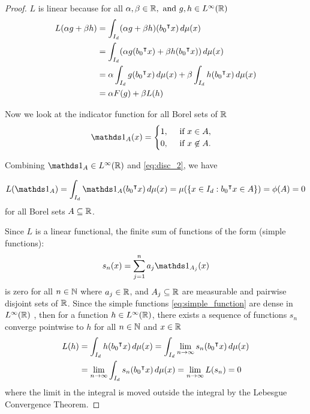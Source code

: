 \begin{proof}
    $L$ is linear because for all $\alpha, \beta \in \mathbb{R}, \text{ and } g, h \in
    L^{\infty}(\mathbb{R})$
    \begin{align*}
        L(\alpha g + \beta h)
        &= \int_{I_d} (\alpha g + \beta h) (b_0{}^{\intercal} x) \,d\mu(x) \\
        &= \int_{I_d} (\alpha g(b_0{}^{\intercal} x) + \beta h (b_0{}^{\intercal} x)) \, d\mu(x) \\
        &= \alpha \int_{I_d} g(b_0{}^{\intercal} x) \,d\mu(x) 
            + \beta \int_{I_d} h(b_0{}^{\intercal} x) \,d\mu(x) \\
        &= \alpha F(g) + \beta L(h)
    \end{align*}

    Now we look at the indicator function for all Borel sets of $\mathbb{R}$
    \begin{equation}
        \indicator{A}(x) =
        \begin{cases}
            1, \quad \text{ if } x \in A, \\
            0, \quad \text{ if } x \not\in A.
        \end{cases}
    \end{equation}

    Combining $\indicator{A} \in \lp{\infty}(\R)$ and \eqref{eq:disc_2}, we
    have 

    \begin{equation}
        L(\indicator{A}) = \int_{I_d} \indicator{A}(b_0\tr x)\,d\mu(x)
        = \mu(\{ x\in I_d: b_0\tr x\in A \}) = \phi(A) = 0
    \end{equation}
    for all Borel sets $A \subseteq \mathbb{R}$.

    Since $L$ is a linear functional, the finite sum of functions of the form
    (simple functions):
    \begin{equation}
        \label{eq:simple_function}
        s_n(x) = \sum_{j=1}^{n} a_j \indicator{A_j}(x)
    \end{equation}
    is zero for all $n\in\mathbb{N}$ where $a_j \in \mathbb{R}$, and ${A_j} \subseteq \mathbb{R}$ are
    measurable and pairwise disjoint sets of $\mathbb{R}$. Since the simple functions
    \eqref{eq:simple_function} are dense in $L^{\infty}(\mathbb{R})$ \citep[Proposition
    6.7]{alma991031140799705251} , then for a function $h \in L^{\infty}(\mathbb{R})$,
    there exists a sequence of functions $s_n$ converge pointwise to $h$ for all
    $n \in \mathbb{N}$ and $x \in \mathbb{R}$
    \begin{align}
        L(h) &= \int_{I_d} h(b_0{}^{\intercal} x) \,d\mu(x) 
             = \int_{I_d} \lim_{n\to\infty} s_n(b_0{}^{\intercal} x) \,d\mu(x) \\
             &= \lim_{n\to\infty} \int_{I_d} s_n(b_0{}^{\intercal} x) \,d\mu(x)
             = \lim_{n\to\infty} L(s_n)
             = 0
    \end{align}
    where the limit in the integral is moved outside the integral by the
    Lebesgue Convergence Theorem.


\end{proof}
